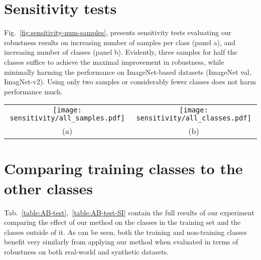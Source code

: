 \documentclass{article}
\begin{document}
\begin{figure*}[h!]
\end{figure*}

\clearpage

\section{Sensitivity tests}
\label{sec:sensitivity}
Fig.~\ref{fig:sensitivity-num-samples}, presents sensitivity tests evaluating our robustness results on increasing number of samples per class (panel a), and increasing number of classes (panel b). Evidently, three samples for half the classes suffice to achieve the maximal improvement in robustness, while minimally harming the performance on ImageNet-based datasets (ImageNet val, ImagNet-v2). Using only two samples or considerably fewer classes does not harm performance much.

\begin{figure*}[h!]\centering
\begin{tabular}{c@{~~~~~~~~~~~~~~~~}c@{}}
    {{\texttt{[image: sensitivity/all\_samples.pdf]} }}&
    {{\texttt{[image: sensitivity/all\_classes.pdf]}}}
    \\
    (a) & (b)\\
    \end{tabular}
\caption{Evaluation of our method's sensitivity to (a) the number of samples used per class in the training set (we use ), and (b) number of training classes (we use ), on ViT-B~\cite{dosovitskiy2020image}. As can be seen, all the presented combinations of hyperparameters result in a significant increase in robustness, and a relatively modest decrease in INet val, INet-v2 accuracy.}\label{fig:sensitivity-num-samples}\vspace{-14px}
\end{figure*}

\clearpage

\section{Comparing training classes to the other classes}
\label{sec:ab}
Tab.~\ref{table:AB-test},~\ref{table:AB-test-SI} contain the full results of our experiment comparing the effect of our method on the classes in the training set and the classes outside of it. As can be seen, both the training and non-training classes benefit very similarly from applying our method when evaluated in terms of robustness on both real-world and synthetic datasets.
\end{document}
